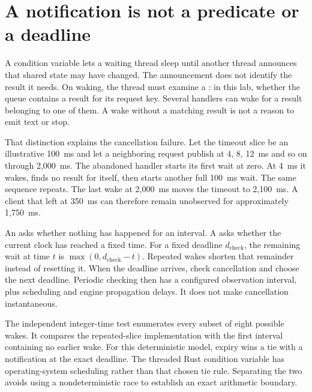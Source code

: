 \section{A notification is not a predicate or a deadline}
A condition variable lets a waiting thread sleep until another thread
announces that shared state may have changed. The announcement does not
identify the result it needs. On waking, the thread must examine a
: in this lab, whether the queue contains a result for its
request key. Several handlers can wake for a result belonging to one of
them. A wake without a matching result is not a reason to emit text or stop.

That distinction explains the cancellation failure. Let the timeout slice
be an illustrative 100~ms and let a neighboring request publish at 4, 8,
12~ms and so on through 2,000~ms. The abandoned handler starts its first
wait at zero. At 4~ms it wakes, finds no result for itself, then starts
another full 100~ms wait. The same sequence repeats. The last wake at
2,000~ms moves the timeout to 2,100~ms. A client that left at 350~ms can
therefore remain unobserved for approximately 1,750~ms.


An  asks whether nothing has happened for an interval.
A  asks whether the current clock has reached a fixed time.
For a fixed deadline $d_{\mathrm{check}}$, the remaining wait at time $t$
is $\max(0,d_{\mathrm{check}}-t)$. Repeated wakes shorten that remainder
instead of resetting it. When the deadline arrives, check cancellation
and choose the next deadline. Periodic checking then has a configured
observation interval, plus scheduling and engine propagation delays.
It does not make cancellation instantaneous.

The independent integer-time test enumerates every subset of eight possible
wakes. It compares the repeated-slice implementation with the first
interval containing no earlier wake. For this deterministic model, expiry
wins a tie with a notification at the exact deadline. The threaded Rust
condition variable has operating-system scheduling rather than that
chosen tie rule. Separating the two avoids using a nondeterministic race
to establish an exact arithmetic boundary.

